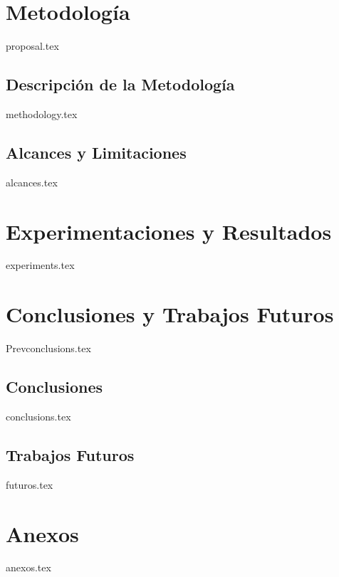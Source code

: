 \documentclass{report}
\begin{document}
\chapter{Metodología}
{proposal.tex}

\section{Descripción de la Metodología}
{methodology.tex}

\section{Alcances y Limitaciones}
{alcances.tex}




\chapter{Experimentaciones y Resultados}
{experiments.tex}



\chapter{Conclusiones y Trabajos Futuros}
{Prevconclusions.tex}

\section{Conclusiones}
{conclusions.tex}

\section{Trabajos Futuros}
{futuros.tex}








%

\nocite{zobel}
\nocite{swales}




\newpage

\chapter*{Anexos}
{anexos.tex}
\end{document}

